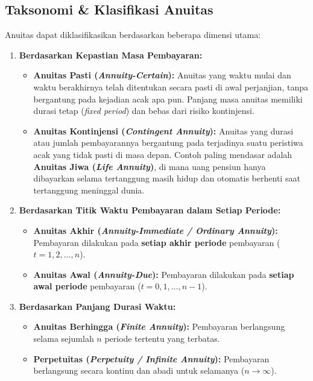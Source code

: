 \documentclass[11pt,a4paper]{article}
\begin{document}
\subsection{Taksonomi \& Klasifikasi Anuitas}

Anuitas dapat diklasifikasikan berdasarkan beberapa dimensi utama:

\begin{enumerate}[label=\textbf{\arabic*.}]
    \item \textbf{Berdasarkan Kepastian Masa Pembayaran:}
    \begin{itemize}
        \item \textbf{Anuitas Pasti (\textit{Annuity-Certain}):} Anuitas yang waktu mulai dan waktu berakhirnya telah ditentukan secara pasti di awal perjanjian, tanpa bergantung pada kejadian acak apa pun. Panjang masa anuitas memiliki durasi tetap (\textit{fixed period}) dan bebas dari risiko kontinjensi.
        \item \textbf{Anuitas Kontinjensi (\textit{Contingent Annuity}):} Anuitas yang durasi atau jumlah pembayarannya bergantung pada terjadinya suatu peristiwa acak yang tidak pasti di masa depan. Contoh paling mendasar adalah \textbf{Anuitas Jiwa (\textit{Life Annuity})}, di mana uang pensiun hanya dibayarkan selama tertanggung masih hidup dan otomatis berhenti saat tertanggung meninggal dunia.
    \end{itemize}

    \item \textbf{Berdasarkan Titik Waktu Pembayaran dalam Setiap Periode:}
    \begin{itemize}
        \item \textbf{Anuitas Akhir (\textit{Annuity-Immediate / Ordinary Annuity}):} Pembayaran dilakukan pada \textbf{setiap akhir periode} pembayaran ($t = 1, 2, \dots, n$).
        \item \textbf{Anuitas Awal (\textit{Annuity-Due}):} Pembayaran dilakukan pada \textbf{setiap awal periode} pembayaran ($t = 0, 1, \dots, n-1$).
    \end{itemize}

    \item \textbf{Berdasarkan Panjang Durasi Waktu:}
    \begin{itemize}
        \item \textbf{Anuitas Berhingga (\textit{Finite Annuity}):} Pembayaran berlangsung selama sejumlah $n$ periode tertentu yang terbatas.
        \item \textbf{Perpetuitas (\textit{Perpetuity / Infinite Annuity}):} Pembayaran berlangsung secara kontinu dan abadi untuk selamanya ($n \to \infty$).
    \end{itemize}


\end{enumerate}
\end{document}
